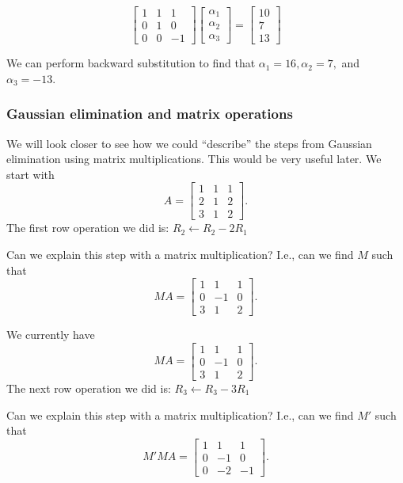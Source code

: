 \begin{frame}
    \[
    \begin{bmatrix}
      1 & 1 & 1 \\
      0 & 1 & 0 \\
      0 & 0 & -1
    \end{bmatrix}
    \begin{bmatrix}
      \alpha_1 \\
      \alpha_2 \\
      \alpha_3
    \end{bmatrix}
    =
    \begin{bmatrix}
      10 \\
      7 \\
      13
    \end{bmatrix}
    \]
    
    \pause

    We can perform backward substitution to find that $\alpha_1=16,
    \alpha_2=7,$ and $\alpha_3=-13$.

\end{frame}

\begin{frame}
\frametitle{Gaussian elimination and matrix operations}

We will look closer to see how we could ``describe'' the steps from
Gaussian elimination using matrix multiplications.  This would be very
useful later.
We start with
\[
A =
\begin{bmatrix}
  1 & 1 & 1 \\
  2 & 1 & 2 \\
  3 & 1 & 2
\end{bmatrix}.
\]
The first row operation we did is: $R_2\leftarrow R_2-2R_1$

Can we explain this step with a matrix multiplication? \pause I.e., can we find $M$ such that
\[
MA = 
\begin{bmatrix}
  1 & 1 & 1 \\
  0 & -1 & 0 \\
  3 & 1 & 2
\end{bmatrix}.
\]

\end{frame}

\begin{frame}
We currently have
\[
MA =
\begin{bmatrix}
  1 & 1 & 1 \\
  0 & -1 & 0 \\
  3 & 1 & 2
\end{bmatrix}.
\]
The next row operation we did is: $R_3\leftarrow R_3-3R_1$

Can we explain this step with a matrix multiplication? \pause I.e., can we find $M'$ such that
\[
M'MA = 
\begin{bmatrix}
  1 & 1 & 1 \\
  0 & -1 & 0 \\
  0 & -2 & -1
\end{bmatrix}.
\]
\end{frame}

